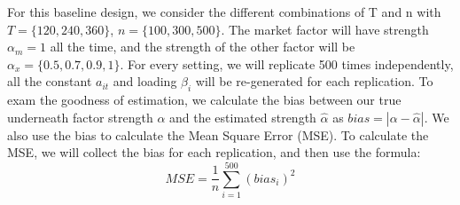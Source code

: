 \documentclass[12pt]{article}
\begin{document}
For this baseline design, we consider the different combinations of T and n with $T = \{120, 240, 360\}$, $n =\{100, 300, 500\} $.
The market factor will have strength $\alpha_m = 1$ all the time, and the strength of the other factor will be $\alpha_{x} = \{0.5, 0.7, 0.9,1\}$. For every setting, we will replicate 500 times independently, all the constant $a_{it}$ and loading $\beta_i$ will be re-generated for each replication.
To exam the goodness of estimation, we calculate the bias between our true underneath factor strength $\alpha$ and the estimated strength $\hat{\alpha}$ as $ bias = |\alpha - \hat{\alpha}|$. 
We also use the bias to calculate the Mean Square Error (MSE).
To calculate the MSE, we will collect the bias for each replication, and then use the formula: 
\[ MSE =\frac{1}{n}\sum_{i=1}^{500}(bias_i)^2 \]

\newpage




		
\end{document}
